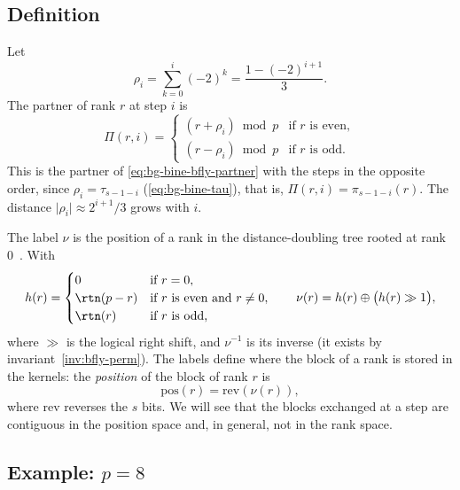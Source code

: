 \subsection{Definition}\label{sec:bfly-def}

Let
\begin{equation}
  \rho_i=\sum_{k=0}^{i}(-2)^k=\frac{1-(-2)^{i+1}}{3}.
  \label{eq:bfly-rho}
\end{equation}
The partner of rank $r$ at step $i$ is
\begin{equation}
  \Pi(r,i)=
  \begin{cases}
    (r+\rho_i)\bmod p & \text{if $r$ is even},\\
    (r-\rho_i)\bmod p & \text{if $r$ is odd}.
  \end{cases}
  \label{eq:bfly-partner}
\end{equation}
This is the partner of \cref{eq:bg-bine-bfly-partner} with the steps in the opposite order, since $\rho_i=\tau_{s-1-i}$ (\cref{eq:bg-bine-tau}), that is, $\Pi(r,i)=\pi_{s-1-i}(r)$.
The distance $\lvert\rho_i\rvert\approx 2^{i+1}/3$ grows with $i$.

The label $\nu$ is the position of a rank in the distance-doubling \bine{} tree rooted at rank $0$~\cite{desensi2025bine}.
With
\begin{equation}
  h(r)=
  \begin{cases}
    0 & \text{if } r=0,\\
    \rtn(p-r) & \text{if $r$ is even and } r\neq0,\\
    \rtn(r) & \text{if $r$ is odd,}
  \end{cases}
  \qquad
  \nu(r)=h(r)\oplus\bigl(h(r)\gg1\bigr),
  \label{eq:bfly-nu}
\end{equation}
where $\gg$ is the logical right shift, and $\nu^{-1}$ is its inverse (it exists by invariant~\ref{inv:bfly-perm}).
The labels define where the block of a rank is stored in the kernels: the \emph{position} of the block of rank $r$ is
\begin{equation}
  \mathrm{pos}(r)=\mathrm{rev}(\nu(r)),
\end{equation}
where $\mathrm{rev}$ reverses the $s$ bits.
We will see that the blocks exchanged at a step are contiguous in the position space and, in general, not in the rank space.

\subsection{Example: \texorpdfstring{$p=8$}{p = 8}}

